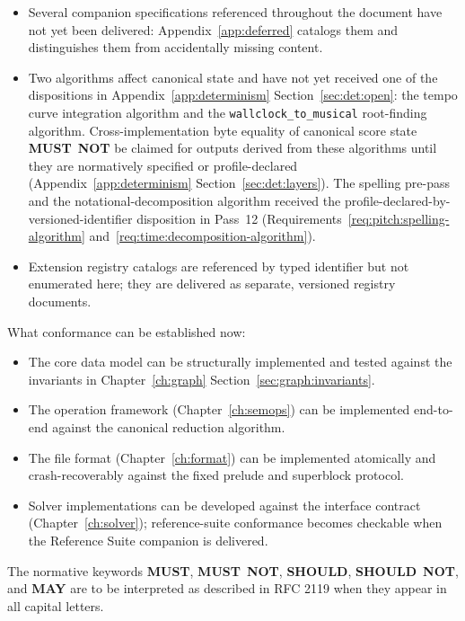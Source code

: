 \documentclass[11pt,letterpaper]{report}
\newcommand{\MUST}{\textbf{MUST}}
\newcommand{\MUSTNOT}{\textbf{MUST}\nobreak\ \textbf{NOT}}
\newcommand{\SHOULD}{\textbf{SHOULD}}
\newcommand{\SHOULDNOT}{\textbf{SHOULD}\nobreak\ \textbf{NOT}}
\newcommand{\MAY}{\textbf{MAY}}
\begin{document}
\begin{itemize}
  \item Several companion specifications referenced throughout
    the document have not yet been delivered:
    Appendix~\ref{app:deferred} catalogs them and distinguishes
    them from accidentally missing content.
  \item Two algorithms affect canonical state and have not
    yet received one of the dispositions in
    Appendix~\ref{app:determinism}
    Section~\ref{sec:det:open}: the tempo curve
    integration algorithm and the
    \texttt{wallclock\_to\_musical} root-finding algorithm.
    Cross-implementation byte equality of canonical score state
    \MUSTNOT{} be claimed for outputs derived from these
    algorithms until they are normatively specified or
    profile-declared (Appendix~\ref{app:determinism}
    Section~\ref{sec:det:layers}). The spelling pre-pass and the
    notational-decomposition algorithm received the
    profile-declared-by-versioned-identifier disposition in
    Pass~12
    (Requirements~\ref{req:pitch:spelling-algorithm}
    and~\ref{req:time:decomposition-algorithm}).
  \item Extension registry catalogs are referenced by typed
    identifier but not enumerated here; they are delivered as
    separate, versioned registry documents.
\end{itemize}

What conformance can be established now:

\begin{itemize}
  \item The core data model can be structurally implemented and
    tested against the invariants in
    Chapter~\ref{ch:graph} Section~\ref{sec:graph:invariants}.
  \item The operation framework
    (Chapter~\ref{ch:semops}) can be implemented end-to-end
    against the canonical reduction algorithm.
  \item The file format
    (Chapter~\ref{ch:format}) can be implemented atomically and
    crash-recoverably against the fixed prelude and superblock
    protocol.
  \item Solver implementations can be developed against the
    interface contract (Chapter~\ref{ch:solver}); reference-suite
    conformance becomes checkable when the Reference Suite
    companion is delivered.
\end{itemize}

The normative keywords \MUST, \MUSTNOT, \SHOULD, \SHOULDNOT, and \MAY{} are
to be interpreted as described in RFC 2119 when they appear in all
capital letters.
\end{document}
